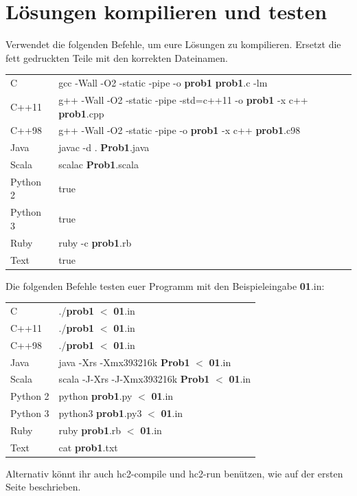 \section{Lösungen kompilieren und testen}
Verwendet die folgenden Befehle, um eure Lösungen zu kompilieren. Ersetzt die
fett gedruckten Teile mit den korrekten Dateinamen.
\begin{center}
\begin{tabular}{l|p{14cm}}
C&
gcc -Wall -O2 -static -pipe -o \textbf{prob1} \textbf{prob1}.c -lm \\
C++11&
g++ -Wall -O2 -static -pipe -std=c++11 -o \textbf{prob1} -x c++ \textbf{prob1}.cpp \\
C++98&
g++ -Wall -O2 -static -pipe -o \textbf{prob1} -x c++ \textbf{prob1}.c98 \\
Java&
javac -d . \textbf{Prob1}.java\\
Scala&
scalac \textbf{Prob1}.scala\\
Python 2&
true\\
Python 3&
true\\
Ruby&
ruby -c \textbf{prob1}.rb\\
Text&
true\\
\end{tabular}
\end{center}
Die folgenden Befehle testen euer Programm mit den Beispieleingabe \textbf{01}.in:
\begin{center}
\begin{tabular}{l|p{14cm}}
C&
./\textbf{prob1} $<$ \textbf{01}.in\\
C++11&
./\textbf{prob1} $<$ \textbf{01}.in\\
C++98&
./\textbf{prob1} $<$ \textbf{01}.in\\
Java&
java -Xrs -Xmx393216k \textbf{Prob1} $<$ \textbf{01}.in\\
Scala&
scala -J-Xrs -J-Xmx393216k \textbf{Prob1} $<$ \textbf{01}.in\\
Python 2&
python \textbf{prob1}.py $<$ \textbf{01}.in\\
Python 3&
python3 \textbf{prob1}.py3 $<$ \textbf{01}.in\\
Ruby&
ruby \textbf{prob1}.rb $<$ \textbf{01}.in\\
Text&
cat \textbf{prob1}.txt\\
\end{tabular}
\end{center}
Alternativ könnt ihr auch hc2-compile und hc2-run benützen, wie auf der ersten Seite
beschrieben.

